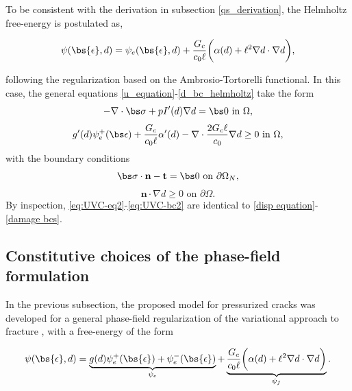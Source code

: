 \noindent To be consistent with the derivation in subsection \ref{qs_derivation}, the Helmholtz free-energy is postulated as,

\begin{equation}\label{helmholtz free-energy postulate}
    \psi(\bs{\epsilon},d) = \psi_e(\bs{\epsilon},d) + \dfrac{G_c}{c_0\ell}\bigg( \alpha(d) + \ell^2\nabla d \cdot \nabla d\bigg),
\end{equation}

\noindent following the regularization based on the Ambrosio-Tortorelli functional. In this case, the general equations \eqref{u_equation}-\eqref{d_bc_helmholtz} take the form
\begin{equation}
\label{eq:UVC-eq2}
    -\nabla \cdot \bs\sigma  + pI'(d) \nabla d = \bs 0 \text{ in }\Omega,
\end{equation}
\begin{equation}
    g'(d) \psi_e^+(\bs\epsilon)
    + \dfrac{G_c}{c_0\ell}\alpha'(d) - \nabla \cdot \dfrac{2G_c\ell}{c_0}\nabla d \ge 0 \text{ in }\Omega,
\end{equation}
 with the boundary conditions
\begin{equation}
    \bs\sigma\cdot \textbf{n}-\textbf{t} = \bs 0 \text{ on }\partial\Omega_N,
\end{equation}
\begin{equation}
\label{eq:UVC-bc2}
    \textbf{n}\cdot \nabla d \ge 0 \text{ on }\partial\Omega.
\end{equation}
By inspection, \eqref{eq:UVC-eq2}-\eqref{eq:UVC-bc2} are identical to \eqref{disp equation}-\eqref{damage bcs}.

\subsection{Constitutive choices of the phase-field formulation}

In the previous subsection, the proposed model for pressurized cracks was developed for a general phase-field regularization of the variational approach to fracture \cite{francfort1998revisiting}, with a free-energy of the form

\begin{equation}\label{PF general form}
    \psi(\bs{\epsilon},d) = \underbrace{g(d)\psi_e^+(\bs{\epsilon}) + \psi_e^-(\bs{\epsilon})}_{\psi_e} + \underbrace{\frac{G_c}{c_0\ell}\bigg( \alpha(d) + \ell^2\nabla d \cdot \nabla d\bigg)}_{\psi_f}.
\end{equation}

